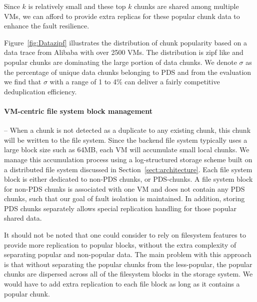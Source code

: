 Since $k$ is relatively small and these top $k$ chunks are shared among multiple VMs, 
we can afford to provide extra replicas for these popular chunk data to enhance the fault resilience.

Figure~\ref{fig:Datazipf} illustrates the distribution of chunk popularity based on a data trace from Alibaba with over 2500 VMs.
The distribution is zipf like and popular chunks are dominating the large portion of data chunks.
We denote $\sigma$ as the percentage of unique data chunks belonging to PDS and from the evaluation we find that
$\sigma$ with a range of 1 to 4\% can deliver a fairly competitive deduplication efficiency.


\paragraph*{VM-centric file system block management} --
When a chunk is not detected as a duplicate to any existing chunk, this chunk will be written
to the file system. Since the backend file system typically uses a large block size such as 64MB, each VM will 
accumulate small local chunks. We manage this accumulation process using a log-structured storage scheme built
on a distributed file system discussed in Section~\ref{sect:architecture}.
Each file system block is either dedicated to non-PDS chunks, or PDS-chunks.
A file system block for non-PDS chunks is associated with one VM and does not contain
any PDS chunks, such that our goal of fault isolation is maintained.
In addition, storing PDS chunks separately allows special replication handling for those popular shared data. 


It should not be noted that one could consider 
to rely on filesystem features to provide more replication to popular
blocks, without the extra complexity of separating popular and non-popular
data. The main problem with this  approach is that without separating the
popular chunks from the less-popular, the popular chunks are dispersed across
all of the filesystem blocks in the storage system.  We would
have to add extra replication to each file block as long as it contains a popular chunk.


